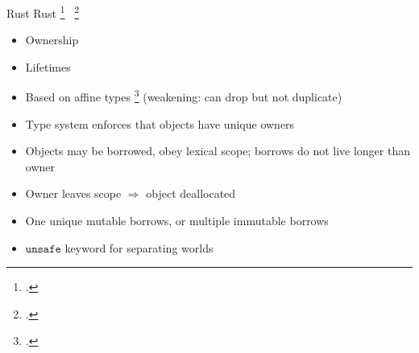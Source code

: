 \documentclass[aspectratio=169]{beamer}
\begin{document}
\begin{frame}{Rust}
    Rust \footcite{matsakis_rust_2014} \ \footcite{jung_rustbelt:_2017}
%
%
    \begin{itemize}
        \item Ownership 
        \item Lifetimes
        \item Based on affine types \footcite{tov_practical_2011} (weakening: can drop but not duplicate)
        \item Type system enforces that objects have unique \alert{owners}
        \item Objects may be borrowed, obey lexical scope; borrows do not live longer than owner 
        \item Owner leaves scope $\Rightarrow$ object \alert{deallocated}
        \item One \alert{unique} mutable borrows, or multiple immutable borrows %
        \item $\texttt{unsafe}$ keyword for separating worlds %
    \end{itemize}
\end{frame}
\end{document}
